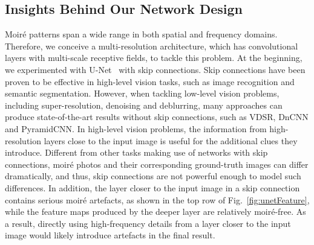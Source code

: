 \documentclass[journal]{IEEEtran}
\begin{document}
\subsection{Insights Behind Our Network Design}
Moir\'{e} patterns span a wide range in both spatial and frequency domains. Therefore, we conceive a multi-resolution architecture, which has convolutional layers with multi-scale receptive fields, to tackle this problem. At the beginning, we experimented with U-Net~\cite{ronneberger2015u} with skip connections. Skip connections have been proven to be effective in high-level vision tasks, such as image recognition and semantic segmentation. However, when tackling low-level vision problems, including super-resolution, denoising and deblurring, many approaches can produce state-of-the-art results without skip connections, such as VDSR, DnCNN and PyramidCNN. In high-level vision problems, the information from high-resolution layers close to the input image is useful for the additional clues they introduce. Different from other tasks making use of networks with skip connections, moir\'{e} photos and their corresponding ground-truth images can differ dramatically, and thus, skip connections are not powerful enough to model such differences. In addition, the layer closer to the input image in a skip connection contains serious moir\'{e} artefacts, as shown in the top row of Fig.~\ref{fig:unetFeature}, while the feature maps produced by the deeper layer are relatively moir\'{e}-free.  As a result, directly using high-frequency details from a layer closer to the input image would likely introduce artefacts in the final result.
\end{document}
